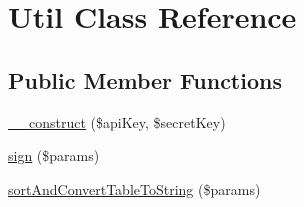 \hypertarget{class_util}{\section{Util Class Reference}
\label{class_util}
}
\subsection*{Public Member Functions}
\begin{DoxyCompactItemize}
\item 
\hyperlink{class_util_a49f2ad222e06420736d750e167d55d7c}{\+\_\+\+\_\+construct} (\$api\+Key, \$secret\+Key)
\item 
\hyperlink{class_util_aa37702d993eaa917ef46f1751dcee902}{sign} (\$params)
\item 
\hyperlink{class_util_ae2103f7166f0cb8a71b58453d7e6829e}{sort\+And\+Convert\+Table\+To\+String} (\$params)
\end{DoxyCompactItemize}
